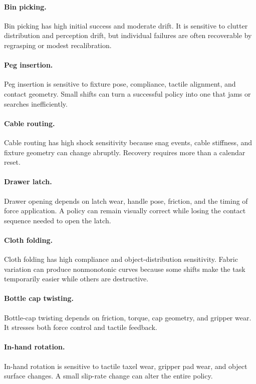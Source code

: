 \documentclass{article}
\begin{document}
\paragraph{Bin picking.}
Bin picking has high initial success and moderate drift. It is sensitive to
clutter distribution and perception drift, but individual failures are often
recoverable by regrasping or modest recalibration.

\paragraph{Peg insertion.}
Peg insertion is sensitive to fixture pose, compliance, tactile alignment, and
contact geometry. Small shifts can turn a successful policy into one that jams
or searches inefficiently.

\paragraph{Cable routing.}
Cable routing has high shock sensitivity because snag events, cable stiffness,
and fixture geometry can change abruptly. Recovery requires more than a
calendar reset.

\paragraph{Drawer latch.}
Drawer opening depends on latch wear, handle pose, friction, and the timing of
force application. A policy can remain visually correct while losing the contact
sequence needed to open the latch.

\paragraph{Cloth folding.}
Cloth folding has high compliance and object-distribution sensitivity. Fabric
variation can produce nonmonotonic curves because some shifts make the task
temporarily easier while others are destructive.

\paragraph{Bottle cap twisting.}
Bottle-cap twisting depends on friction, torque, cap geometry, and gripper wear.
It stresses both force control and tactile feedback.

\paragraph{In-hand rotation.}
In-hand rotation is sensitive to tactile taxel wear, gripper pad wear, and
object surface changes. A small slip-rate change can alter the entire policy.
\end{document}
